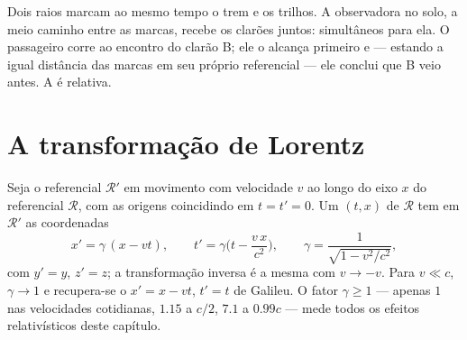 \begin{omfigure}

{\small Dois raios marcam ao mesmo tempo o trem e os trilhos. A
observadora no solo, a meio caminho entre as marcas, recebe os clarões
juntos: simultâneos para ela. O passageiro corre ao encontro do clarão
B; ele o alcança primeiro e --- estando a igual distância das marcas em
seu próprio referencial --- ele conclui que B veio antes. A
 é relativa.}
\end{omfigure}

\section{A transformação de Lorentz}

\begin{theorem}\label{thm:b3:relativistic-kinematics:lorentz}
Seja o referencial $\mathcal R'$ em movimento com velocidade $v$ ao
longo do eixo $x$ do referencial $\mathcal R$, com as origens
coincidindo em $t = t' = 0$. Um  $(t, x)$ de $\mathcal R$ tem em
$\mathcal R'$ as coordenadas
\[
x' = \gamma\,(x - vt) , \qquad
t' = \gamma\Big(t - \frac{v\,x}{c^2}\Big) , \qquad
\gamma = \frac{1}{\sqrt{1 - v^2/c^2}} ,
\]
com $y' = y$, $z' = z$; a transformação inversa é a mesma com
$v \to -v$. Para $v \ll c$, $\gamma \to 1$ e recupera-se o
$x' = x - vt$, $t' = t$ de Galileu. O fator $\gamma \ge 1$ --- apenas
$1$ nas velocidades cotidianas, $1.15$ a $c/2$, $7.1$ a $0.99c$ ---
mede todos os efeitos relativísticos deste capítulo.
\end{theorem}


